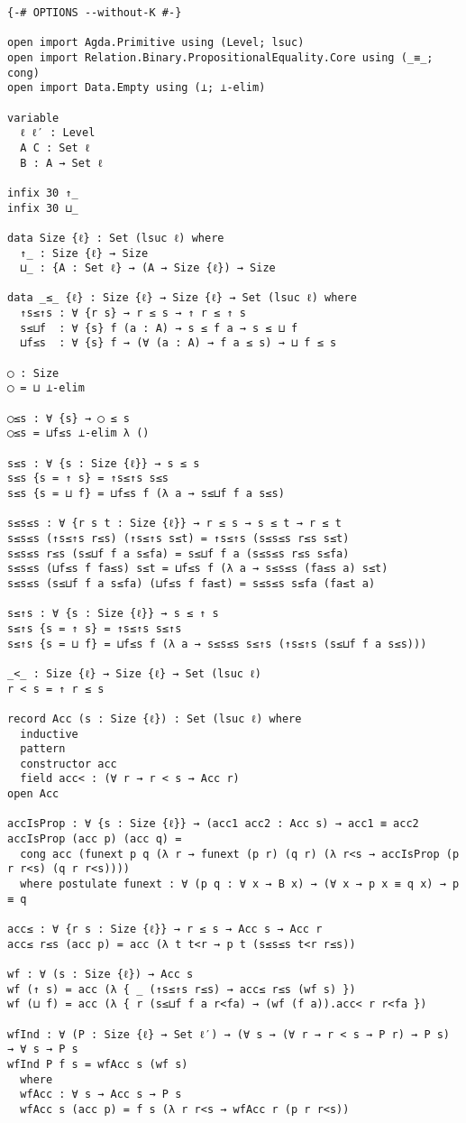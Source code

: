 \begin{singlespace}
\begin{verbatim}
{-# OPTIONS --without-K #-}

open import Agda.Primitive using (Level; lsuc)
open import Relation.Binary.PropositionalEquality.Core using (_≡_; cong)
open import Data.Empty using (⊥; ⊥-elim)

variable
  ℓ ℓ′ : Level
  A C : Set ℓ
  B : A → Set ℓ

infix 30 ↑_
infix 30 ⊔_

data Size {ℓ} : Set (lsuc ℓ) where
  ↑_ : Size {ℓ} → Size
  ⊔_ : {A : Set ℓ} → (A → Size {ℓ}) → Size

data _≤_ {ℓ} : Size {ℓ} → Size {ℓ} → Set (lsuc ℓ) where
  ↑s≤↑s : ∀ {r s} → r ≤ s → ↑ r ≤ ↑ s
  s≤⊔f  : ∀ {s} f (a : A) → s ≤ f a → s ≤ ⊔ f
  ⊔f≤s  : ∀ {s} f → (∀ (a : A) → f a ≤ s) → ⊔ f ≤ s

◯ : Size
◯ = ⊔ ⊥-elim

◯≤s : ∀ {s} → ◯ ≤ s
◯≤s = ⊔f≤s ⊥-elim λ ()

s≤s : ∀ {s : Size {ℓ}} → s ≤ s
s≤s {s = ↑ s} = ↑s≤↑s s≤s
s≤s {s = ⊔ f} = ⊔f≤s f (λ a → s≤⊔f f a s≤s)

s≤s≤s : ∀ {r s t : Size {ℓ}} → r ≤ s → s ≤ t → r ≤ t
s≤s≤s (↑s≤↑s r≤s) (↑s≤↑s s≤t) = ↑s≤↑s (s≤s≤s r≤s s≤t)
s≤s≤s r≤s (s≤⊔f f a s≤fa) = s≤⊔f f a (s≤s≤s r≤s s≤fa)
s≤s≤s (⊔f≤s f fa≤s) s≤t = ⊔f≤s f (λ a → s≤s≤s (fa≤s a) s≤t)
s≤s≤s (s≤⊔f f a s≤fa) (⊔f≤s f fa≤t) = s≤s≤s s≤fa (fa≤t a)

s≤↑s : ∀ {s : Size {ℓ}} → s ≤ ↑ s
s≤↑s {s = ↑ s} = ↑s≤↑s s≤↑s
s≤↑s {s = ⊔ f} = ⊔f≤s f (λ a → s≤s≤s s≤↑s (↑s≤↑s (s≤⊔f f a s≤s)))

_<_ : Size {ℓ} → Size {ℓ} → Set (lsuc ℓ)
r < s = ↑ r ≤ s

record Acc (s : Size {ℓ}) : Set (lsuc ℓ) where
  inductive
  pattern
  constructor acc
  field acc< : (∀ r → r < s → Acc r)
open Acc

accIsProp : ∀ {s : Size {ℓ}} → (acc1 acc2 : Acc s) → acc1 ≡ acc2
accIsProp (acc p) (acc q) =
  cong acc (funext p q (λ r → funext (p r) (q r) (λ r<s → accIsProp (p r r<s) (q r r<s))))
  where postulate funext : ∀ (p q : ∀ x → B x) → (∀ x → p x ≡ q x) → p ≡ q

acc≤ : ∀ {r s : Size {ℓ}} → r ≤ s → Acc s → Acc r
acc≤ r≤s (acc p) = acc (λ t t<r → p t (s≤s≤s t<r r≤s))

wf : ∀ (s : Size {ℓ}) → Acc s
wf (↑ s) = acc (λ { _ (↑s≤↑s r≤s) → acc≤ r≤s (wf s) })
wf (⊔ f) = acc (λ { r (s≤⊔f f a r<fa) → (wf (f a)).acc< r r<fa })

wfInd : ∀ (P : Size {ℓ} → Set ℓ′) → (∀ s → (∀ r → r < s → P r) → P s) → ∀ s → P s
wfInd P f s = wfAcc s (wf s)
  where
  wfAcc : ∀ s → Acc s → P s
  wfAcc s (acc p) = f s (λ r r<s → wfAcc r (p r r<s))
\end{verbatim}
\end{singlespace}

